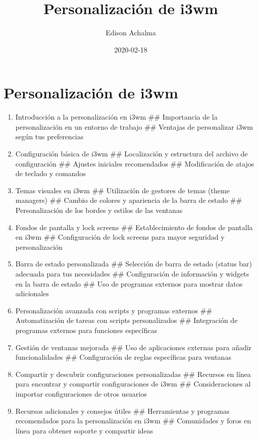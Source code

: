 \documentclass[
  jou,
  floatsintext,
  longtable,
  a4paper,
  nolmodern,
  notxfonts,
  notimes,
  12pt,
  colorlinks=true,linkcolor=blue,citecolor=blue,urlcolor=blue]{apa7}
\title{Personalización de i3wm}
\author{Edison Achalma}
\affiliation{
{Escuela Profesional de Economía, Universidad Nacional de San Cristóbal
de Huamanga}}
\date{2020-02-18}
\begin{document}
\maketitle


\hypertarget{toc}{}
\tableofcontents
\newpage
\section[Introduction]{Personalización de i3wm}

\setcounter{secnumdepth}{3}

\setlength\LTleft{0pt}




\begin{enumerate}
\def\labelenumi{\arabic{enumi}.}
\item
  Introducción a la personalización en i3wm \#\# Importancia de la
  personalización en un entorno de trabajo \#\# Ventajas de personalizar
  i3wm según tus preferencias
\item
  Configuración básica de i3wm \#\# Localización y estructura del
  archivo de configuración \#\# Ajustes iniciales recomendados \#\#
  Modificación de atajos de teclado y comandos
\item
  Temas visuales en i3wm \#\# Utilización de gestores de temas (theme
  managers) \#\# Cambio de colores y apariencia de la barra de estado
  \#\# Personalización de los bordes y estilos de las ventanas
\item
  Fondos de pantalla y lock screens \#\# Establecimiento de fondos de
  pantalla en i3wm \#\# Configuración de lock screens para mayor
  seguridad y personalización
\item
  Barra de estado personalizada \#\# Selección de barra de estado
  (status bar) adecuada para tus necesidades \#\# Configuración de
  información y widgets en la barra de estado \#\# Uso de programas
  externos para mostrar datos adicionales
\item
  Personalización avanzada con scripts y programas externos \#\#
  Automatización de tareas con scripts personalizados \#\# Integración
  de programas externos para funciones específicas
\item
  Gestión de ventanas mejorada \#\# Uso de aplicaciones externas para
  añadir funcionalidades \#\# Configuración de reglas específicas para
  ventanas
\item
  Compartir y descubrir configuraciones personalizadas \#\# Recursos en
  línea para encontrar y compartir configuraciones de i3wm \#\#
  Consideraciones al importar configuraciones de otros usuarios
\item
  Recursos adicionales y consejos útiles \#\# Herramientas y programas
  recomendados para la personalización en i3wm \#\# Comunidades y foros
  en línea para obtener soporte y compartir ideas
\end{enumerate}
\end{document}
